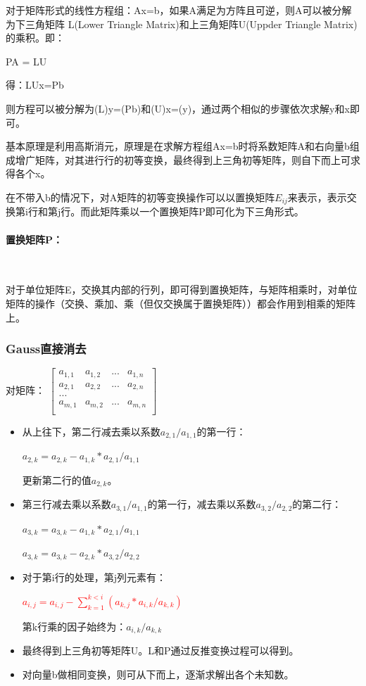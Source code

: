 \documentclass[UTF8]{article}%
\begin{document}
对于矩阵形式的线性方程组：Ax=b，如果A满足为方阵且可逆，则A可以被分解为下三角矩阵 L(Lower Triangle Matrix)和上三角矩阵U(Uppder Triangle Matrix)的乘积。即：

PA = LU

得：LUx=Pb

则方程可以被分解为(L)y=(Pb)和(U)x=(y)，通过两个相似的步骤依次求解y和x即可。

基本原理是利用高斯消元，原理是在求解方程组Ax=b时将系数矩阵A和右向量b组成增广矩阵，对其进行行的初等变换，最终得到上三角初等矩阵，则自下而上可求得各个x。

在不带入b的情况下，对A矩阵的初等变换操作可以以置换矩阵$E_{ij}$来表示，表示交换第i行和第j行。而此矩阵乘以一个置换矩阵P即可化为下三角形式。

\paragraph{置换矩阵P：}~{}

对于单位矩阵E，交换其内部的行列，即可得到置换矩阵，与矩阵相乘时，对单位矩阵的操作（交换、乘加、乘（但仅交换属于置换矩阵））都会作用到相乘的矩阵上。

\subsubsection{Gauss直接消去}

对矩阵：
$
\begin{bmatrix}
    a_{1,1} & a_{1,2} & ... & a_{1,n}\\
    a_{2,1} & a_{2,2} & ... & a_{2,n}\\
    ...     &                        \\
    a_{m,1} & a_{m,2} & ... & a_{m,n}\\
\end{bmatrix}
$

\begin{itemize}
    \item 从上往下，第二行减去乘以系数$a_{2,1}/a_{1,1}$的第一行：
    
    $a_{2,k}=a_{2,k}-a_{1,k}*a_{2,1}/a_{1,1}$

    更新第二行的值$a_{2,k}$。

    \item 第三行减去乘以系数$a_{3,1}/a_{1,1}$的第一行，减去乘以系数$a_{3,2}/a_{2,2}$的第二行：
    
    $a_{3,k}=a_{3,k}-a_{1,k}*a_{2,1}/a_{1,1}$
    
    $a_{3,k}=a_{3,k}-a_{2,k}*a_{3,2}/a_{2,2}$
    \item 对于第i行的处理，第j列元素有：
    
    \textcolor{red}{$a_{i,j}=a_{i,j}-\sum_{k=1}^{k<i}{(a_{k,j}*a_{i,k}/a_{k,k})}$}  

    第k行乘的因子始终为：$a_{i,k}/a_{k,k}$

    \item 最终得到上三角初等矩阵U。L和P通过反推变换过程可以得到。
    \item 对向量b做相同变换，则可从下而上，逐渐求解出各个未知数。
\end{itemize}
\end{document}
